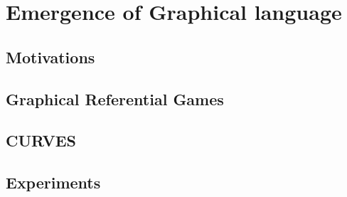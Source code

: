 \chapter{Emergence of Graphical language}

\section{Motivations}
\section{Graphical Referential Games}
\section{CURVES}
\section{Experiments}